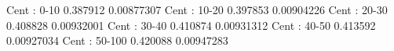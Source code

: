 Cent : 0-10
0.387912 0.00877307
Cent : 10-20
0.397853 0.00904226
Cent : 20-30
0.408828 0.00932001
Cent : 30-40
0.410874 0.00931312
Cent : 40-50
0.413592 0.00927034
Cent : 50-100
0.420088 0.00947283
